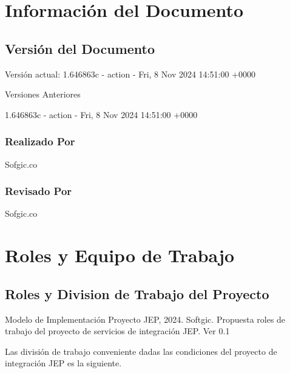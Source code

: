 \documentclass[
  paper=a4,
  ,captions=tableheading
]{scrartcl}
\renewenvironment{quote}{\begin{customblockquote}\list{}{\rightmargin=0em\leftmargin=0em}%
\item\relax\color{blockquote-text}\ignorespaces}{\unskip\unskip\endlist\end{customblockquote}}
\begin{document}
\newpage

\section{Información del
Documento}\label{sec:informaciuxf3n-del-documento}

\subsection{Versión del Documento}\label{sec:versiuxf3n-del-documento}

\begin{quote}
\end{quote}

Versión actual: 1.646863c - action - Fri, 8 Nov 2024 14:51:00 +0000

Versiones Anteriores

1.646863c - action - Fri, 8 Nov 2024 14:51:00 +0000

\subsubsection{Realizado Por}\label{sec:realizado-por}

Sofgic.co

\subsubsection{Revisado Por}\label{sec:revisado-por}

Sofgic.co

\newpage

\section{Roles y Equipo de Trabajo}\label{sec:roles-y-equipo-de-trabajo}

\subsection{Roles y Division de Trabajo del
Proyecto}\label{sec:roles-y-division-de-trabajo-del-proyecto}

\begin{quote}
Modelo de Implementación Proyecto JEP, 2024. Softgic. Propuesta roles de
trabajo del proyecto de servicios de integración JEP. Ver 0.1
\end{quote}

Las división de trabajo conveniente dadas las condiciones del proyecto
de integración JEP es la siguiente.
\end{document}
